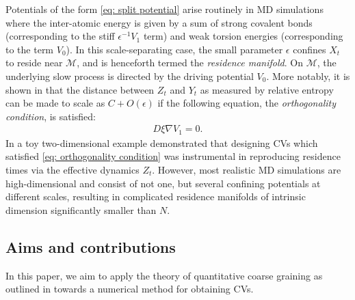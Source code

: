 \documentclass[reqno, 12pt]{article}
\begin{document}
Potentials of the form \eqref{eq: split potential} arise routinely in MD simulations where the inter-atomic energy is given by a sum of strong covalent bonds (corresponding to the stiff $\epsilon^{-1}V_{1}$ term) and weak torsion energies (corresponding to the term $V_0$). In this scale-separating case, the small parameter $\epsilon$ confines $X_t$ to reside near $\mathcal{M}$, and is henceforth termed the \emph{residence manifold}. On $\mathcal{M}$, the underlying slow process is directed by the driving potential $V_0$. More notably, it is shown in \cite{legoll2010effective} that the distance between $Z_t$ and $Y_t$ as measured by relative entropy can be made to scale as $C + O(\epsilon)$ if the following equation, the \emph{orthogonality condition}, is satisfied:   
\begin{align}
    D\xi\nabla V_1 = 0. \label{eq: orthogonality condition} \tag{OC}
\end{align}
In a toy two-dimensional example \parencite{legoll2010effective} demonstrated that designing CVs which satisfied \eqref{eq: orthogonality condition} was instrumental in reproducing residence times via the effective dynamics $Z_t$. However, most realistic MD simulations are high-dimensional and consist of not one, but several confining potentials at different scales, resulting in complicated residence manifolds of intrinsic dimension significantly smaller than $N$. 


\subsection{Aims and contributions} 
In this paper, we aim to apply the theory of quantitative coarse graining as outlined in \cite{legoll2010effective, duong2018quantification, lelievre2019pathwise} towards a numerical method for obtaining CVs. 

\end{document}
